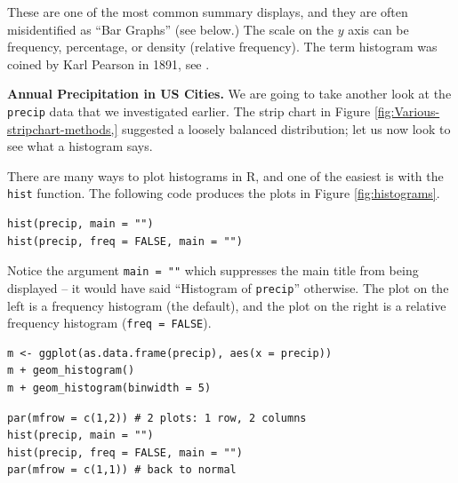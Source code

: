 \documentclass[captions=tableheading]{scrbook}
\begin{document}
These are one of the most common summary displays, and they are often misidentified as ``Bar Graphs'' (see below.) The scale on the \(y\) axis can be frequency, percentage, or density (relative frequency). The term histogram was coined by Karl Pearson in 1891, see \cite{Miller}.

\begin{example}
\textbf{Annual Precipitation in US Cities.} We are going to take another look at the \texttt{precip} data that we investigated earlier. The strip chart in Figure \ref{fig:Various-stripchart-methods,} suggested a loosely balanced distribution; let us now look to see what a histogram says. 

There are many ways to plot histograms in \textsf{R}, and one of the easiest is with the \texttt{hist} function. The following code produces the plots in Figure \ref{fig:histograms}.


\begin{verbatim}
hist(precip, main = "")
hist(precip, freq = FALSE, main = "")
\end{verbatim}

Notice the argument \texttt{main = ""} which suppresses the main title from being displayed -- it would have said ``Histogram of \texttt{precip}'' otherwise. The plot on the left is a frequency histogram (the default), and the plot on the right is a relative frequency histogram (\texttt{freq = FALSE}). 


\begin{verbatim}
m <- ggplot(as.data.frame(precip), aes(x = precip))
m + geom_histogram()
m + geom_histogram(binwidth = 5)
\end{verbatim}








\begin{verbatim}
par(mfrow = c(1,2)) # 2 plots: 1 row, 2 columns
hist(precip, main = "")
hist(precip, freq = FALSE, main = "")
par(mfrow = c(1,1)) # back to normal
\end{verbatim}


\end{example}
\end{document}
